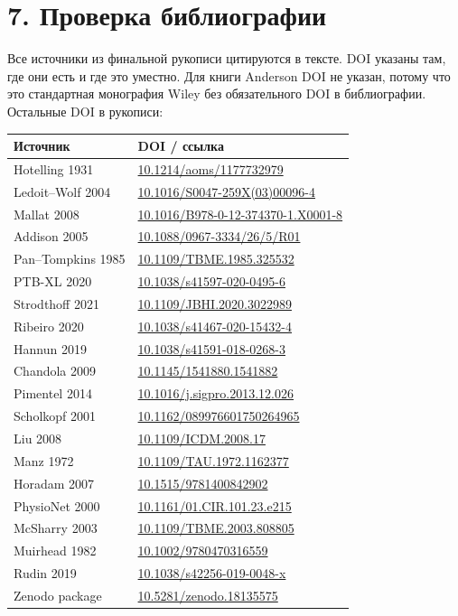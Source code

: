 \documentclass[12pt,a4paper]{article}
\begin{document}
\section*{7. Проверка библиографии}

Все источники из финальной рукописи цитируются в тексте. DOI указаны там, где они есть и где это уместно. Для книги Anderson DOI не указан, потому что это стандартная монография Wiley без обязательного DOI в библиографии. Остальные DOI в рукописи:

\begin{center}
\small
\begin{tabular}{p{}p{}}
\toprule
Источник & DOI / ссылка\\
\midrule
Hotelling 1931 & \url{10.1214/aoms/1177732979}\\
Ledoit--Wolf 2004 & \url{10.1016/S0047-259X(03)00096-4}\\
Mallat 2008 & \url{10.1016/B978-0-12-374370-1.X0001-8}\\
Addison 2005 & \url{10.1088/0967-3334/26/5/R01}\\
Pan--Tompkins 1985 & \url{10.1109/TBME.1985.325532}\\
PTB-XL 2020 & \url{10.1038/s41597-020-0495-6}\\
Strodthoff 2021 & \url{10.1109/JBHI.2020.3022989}\\
Ribeiro 2020 & \url{10.1038/s41467-020-15432-4}\\
Hannun 2019 & \url{10.1038/s41591-018-0268-3}\\
Chandola 2009 & \url{10.1145/1541880.1541882}\\
Pimentel 2014 & \url{10.1016/j.sigpro.2013.12.026}\\
Scholkopf 2001 & \url{10.1162/089976601750264965}\\
Liu 2008 & \url{10.1109/ICDM.2008.17}\\
Manz 1972 & \url{10.1109/TAU.1972.1162377}\\
Horadam 2007 & \url{10.1515/9781400842902}\\
PhysioNet 2000 & \url{10.1161/01.CIR.101.23.e215}\\
McSharry 2003 & \url{10.1109/TBME.2003.808805}\\
Muirhead 1982 & \url{10.1002/9780470316559}\\
Rudin 2019 & \url{10.1038/s42256-019-0048-x}\\
Zenodo package & \url{10.5281/zenodo.18135575}\\
\bottomrule
\end{tabular}
\end{center}
\end{document}
